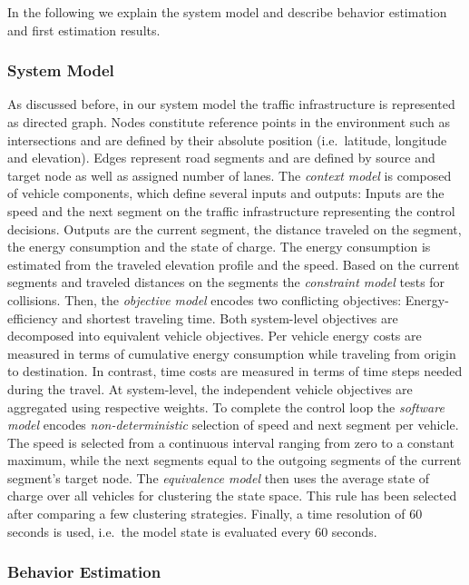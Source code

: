 \documentclass[conference]{../cls/IEEEtran}
\begin{document}
In the following we explain the system model and describe behavior estimation and first estimation results.

\subsubsection*{System Model}

As discussed before, in our system model the traffic infrastructure is represented as directed graph. Nodes constitute reference points in the environment such as intersections and are defined by their absolute position (i.e.\ latitude, longitude and elevation). Edges represent road segments and are defined by source and target node as well as assigned number of lanes. The \textit{context model} is composed of vehicle components, which define several inputs and outputs: Inputs are the speed and the next segment on the traffic infrastructure representing the control decisions. Outputs are the current segment, the distance traveled on the segment, the energy consumption and the state of charge. The energy consumption is estimated from the traveled elevation profile and the speed. Based on the current segments and traveled distances on the segments the \textit{constraint model} tests for collisions. Then, the \textit{objective model} encodes two conflicting objectives: Energy-efficiency and shortest traveling time. Both system-level objectives are decomposed into equivalent vehicle objectives. Per vehicle energy costs are measured in terms of cumulative energy consumption while traveling from origin to destination. In contrast, time costs are measured in terms of time steps needed during the travel. At system-level, the independent vehicle objectives are aggregated using respective weights. To complete the control loop the \textit{software model} encodes \textit{non-deterministic} selection of speed and next segment per vehicle. The speed is selected from a continuous interval ranging from zero to a constant maximum, while the next segments equal to the outgoing segments of the current segment's target node. The \textit{equivalence model} then uses the average state of charge over all vehicles for clustering the state space. This rule has been selected after comparing a few clustering strategies. Finally, a time resolution of 60 seconds is used, i.e.\ the model state is evaluated every 60 seconds.

\subsubsection*{Behavior Estimation}
\end{document}
